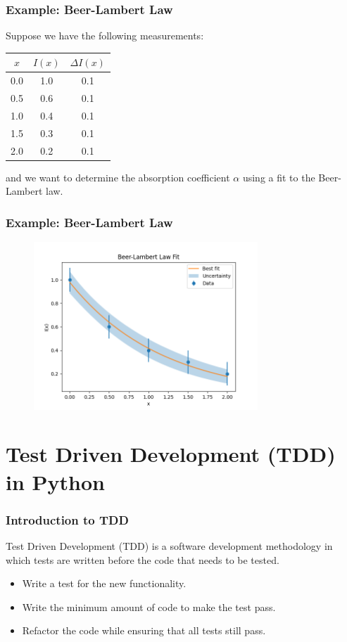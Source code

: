 \documentclass{beamer}
\begin{document}
\begin{frame}
  \frametitle{Example: Beer-Lambert Law}
  Suppose we have the following measurements:
  \begin{table}[H]
    \centering
    \begin{tabular}{|c|c|c|}
      \hline
      $x$ & $I(x)$ & $\Delta I(x)$ \\
      \hline
      0.0 & 1.0 & 0.1 \\
      0.5 & 0.6 & 0.1 \\
      1.0 & 0.4 & 0.1 \\
      1.5 & 0.3 & 0.1 \\
      2.0 & 0.2 & 0.1 \\
      \hline
  \end{tabular}
  \end{table}
  and we want to determine the absorption coefficient $\alpha$ using a fit to the Beer-Lambert law.
\end{frame}
\begin{frame}
  \frametitle{Example: Beer-Lambert Law}
  \vspace{-5mm}
  \begin{figure}
    \centering
    \includegraphics[width=0.75\textwidth]{examples/fig/beerLambert.png}
  \end{figure}
\end{frame}
\section{Test Driven Development (TDD) in Python}
\begin{frame}
  \frametitle{Introduction to TDD}
  Test Driven Development (TDD) is a software development methodology in which tests are written before the code that needs to be tested.
  \begin{itemize}
    \item Write a test for the new functionality.
    \item Write the minimum amount of code to make the test pass.
    \item Refactor the code while ensuring that all tests still pass.
  \end{itemize}
\end{frame}
\end{document}
